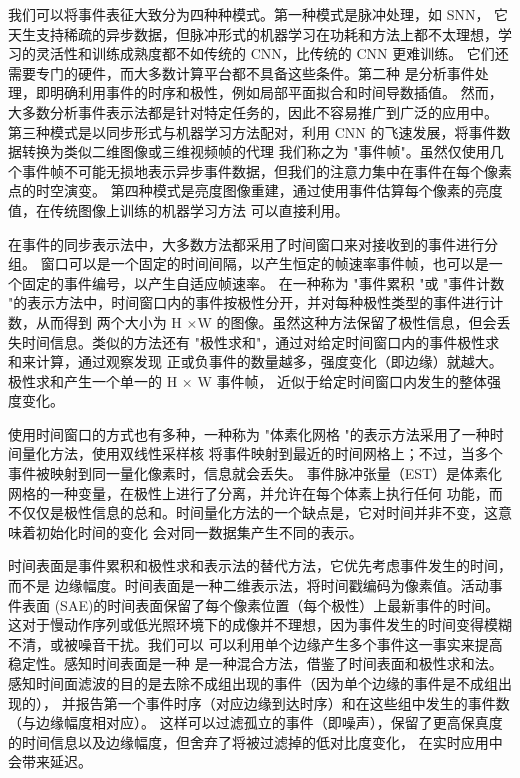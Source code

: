 我们可以将事件表征大致分为四种种模式。第一种模式是脉冲处理，如 SNN，
它天生支持稀疏的异步数据，但脉冲形式的机器学习在功耗和方法上都不太理想，学习的灵活性和训练成熟度都不如传统的 CNN，比传统的 CNN 更难训练。
它们还需要专门的硬件，而大多数计算平台都不具备这些条件。第二种
是分析事件处理，即明确利用事件的时序和极性，例如局部平面拟合和时间导数插值。
然而，大多数分析事件表示法都是针对特定任务的，因此不容易推广到广泛的应用中。
第三种模式是以同步形式与机器学习方法配对，利用 CNN 的飞速发展，将事件数据转换为类似二维图像或三维视频帧的代理
我们称之为 "事件帧"。虽然仅使用几个事件帧不可能无损地表示异步事件数据，但我们的注意力集中在事件在每个像素点的时空演变。
第四种模式是亮度图像重建，通过使用事件估算每个像素的亮度值，在传统图像上训练的机器学习方法
可以直接利用。\cite{baldwin2022time}

在事件的同步表示法中，大多数方法都采用了时间窗口来对接收到的事件进行分组。
窗口可以是一个固定的时间间隔，以产生恒定的帧速率事件帧，也可以是一个固定的事件编号，以产生自适应帧速率。
在一种称为 "事件累积 "或 "事件计数 "的表示方法中，时间窗口内的事件按极性分开，并对每种极性类型的事件进行计数，从而得到
两个大小为 H ×W 的图像。虽然这种方法保留了极性信息，但会丢失时间信息。类似的方法还有 "极性求和"，通过对给定时间窗口内的事件极性求和来计算，通过观察发现
正或负事件的数量越多，强度变化（即边缘）就越大。极性求和产生一个单一的 H × W 事件帧，
近似于给定时间窗口内发生的整体强度变化。

使用时间窗口的方式也有多种，一种称为 "体素化网格 "的表示方法采用了一种时间量化方法，使用双线性采样核
将事件映射到最近的时间网格上；不过，当多个事件被映射到同一量化像素时，信息就会丢失。
事件脉冲张量（EST）是体素化网格的一种变量，在极性上进行了分离，并允许在每个体素上执行任何
功能，而不仅仅是极性信息的总和。时间量化方法的一个缺点是，它对时间并非不变，这意味着初始化时间的变化
会对同一数据集产生不同的表示。

时间表面是事件累积和极性求和表示法的替代方法\cite{benosman2013event}，它优先考虑事件发生的时间，而不是
边缘幅度。时间表面是一种二维表示法，将时间戳编码为像素值。活动事件表面
(SAE)的时间表面保留了每个像素位置（每个极性）上最新事件的时间。
这对于慢动作序列或低光照环境下的成像并不理想，因为事件发生的时间变得模糊不清，或被噪音干扰。我们可以
可以利用单个边缘产生多个事件这一事实来提高稳定性。感知时间表面是一种
是一种混合方法，借鉴了时间表面和极性求和法。感知时间面滤波的目的是去除不成组出现的事件（因为单个边缘的事件是不成组出现的），
并报告第一个事件时序（对应边缘到达时序）和在这些组中发生的事件数（与边缘幅度相对应）。
这样可以过滤孤立的事件（即噪声），保留了更高保真度的时间信息以及边缘幅度，但舍弃了将被过滤掉的低对比度变化，
在实时应用中会带来延迟。

